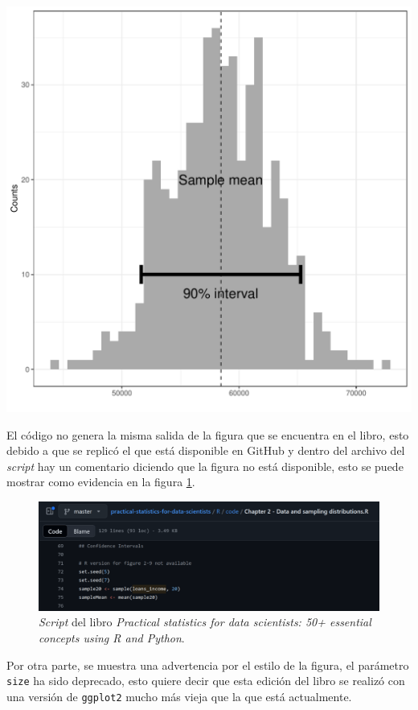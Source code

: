 \documentclass[12pt]{article}\usepackage[]{graphicx}\usepackage[]{xcolor}
\makeatletter
\def\maxwidth{ %
  \ifdim\Gin@nat@width>\linewidth
    \linewidth
  \else
    \Gin@nat@width
  \fi
}
\newenvironment{kframe}{%
 \def\at@end@of@kframe{}%
 \ifinner\ifhmode%
  \def\at@end@of@kframe{\end{minipage}}%
  \begin{minipage}{\columnwidth}%
 \fi\fi%
 \def\FrameCommand##1{\hskip\@totalleftmargin \hskip-\fboxsep
 \colorbox{shadecolor}{##1}\hskip-\fboxsep
     \hskip-\linewidth \hskip-\@totalleftmargin \hskip\columnwidth}%
 \MakeFramed {\advance\hsize-\width
   \@totalleftmargin\z@ \linewidth\hsize
   \@setminipage}}%
 {\par\unskip\endMakeFramed%
 \at@end@of@kframe}
\newenvironment{knitrout}{}{} %
\makeatother
\begin{document}
\begin{knitrout}
\begin{kframe}
{\ttfamily\noindent\color{warningcolor}{\#\# Warning: Using `size` aesthetic for lines was deprecated in ggplot2 3.4.0.\\\#\# i Please use `linewidth` instead.\\\#\# This warning is displayed once every 8 hours.\\\#\# Call `lifecycle::last\_lifecycle\_warnings()` to see where this\\\#\# warning was generated.}}\end{kframe}
\includegraphics[width=\maxwidth]{figure/unnamed-chunk-14-1} 
\end{knitrout}

El código no genera la misma salida de la figura que se encuentra en el libro, esto debido a que se replicó el que está disponible en GitHub y dentro del archivo del \textit{script} hay un comentario diciendo que la figura no está disponible, esto se puede mostrar como evidencia en la figura \ref{fig:GH}.

\begin{figure}[ht]
  \centering
  \includegraphics[width=\textwidth]{img/Punto7.png}
  \caption{\label{fig:GH} \textit{Script} del libro \textit{Practical statistics for data scientists: 50+ essential concepts using R and Python}\cite{bruce2020practical}.}
\end{figure}

Por otra parte, se muestra una advertencia por el estilo de la figura, el parámetro \lstinline|size| ha sido deprecado, esto quiere decir que esta edición del libro se realizó con una versión de \lstinline|ggplot2| mucho más vieja que la que está actualmente.




\printbibliography
\end{document}
